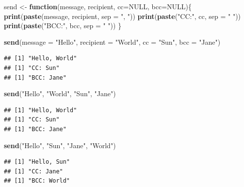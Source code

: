 \documentclass[
]{book}
\newenvironment{Shaded}{\begin{snugshade}}{\end{snugshade}}
\newcommand{\AttributeTok}[1]{\textcolor[rgb]{0.13,0.29,0.53}{#1}}
\newcommand{\ConstantTok}[1]{\textcolor[rgb]{0.56,0.35,0.01}{#1}}
\newcommand{\ControlFlowTok}[1]{\textcolor[rgb]{0.13,0.29,0.53}{\textbf{#1}}}
\newcommand{\FunctionTok}[1]{\textcolor[rgb]{0.13,0.29,0.53}{\textbf{#1}}}
\newcommand{\NormalTok}[1]{#1}
\newcommand{\OtherTok}[1]{\textcolor[rgb]{0.56,0.35,0.01}{#1}}
\newcommand{\StringTok}[1]{\textcolor[rgb]{0.31,0.60,0.02}{#1}}
\begin{document}
\begin{Shaded}
\begin{Highlighting}[]
\NormalTok{send }\OtherTok{\textless{}{-}} \ControlFlowTok{function}\NormalTok{(message, recipient, }\AttributeTok{cc=}\ConstantTok{NULL}\NormalTok{, }\AttributeTok{bcc=}\ConstantTok{NULL}\NormalTok{)\{}
  \FunctionTok{print}\NormalTok{(}\FunctionTok{paste}\NormalTok{(message, recipient, }\AttributeTok{sep =} \StringTok{", "}\NormalTok{))}
  \FunctionTok{print}\NormalTok{(}\FunctionTok{paste}\NormalTok{(}\StringTok{"CC:"}\NormalTok{, cc, }\AttributeTok{sep =} \StringTok{" "}\NormalTok{))}
  \FunctionTok{print}\NormalTok{(}\FunctionTok{paste}\NormalTok{(}\StringTok{"BCC:"}\NormalTok{, bcc, }\AttributeTok{sep =} \StringTok{" "}\NormalTok{))}
\NormalTok{\}}

\FunctionTok{send}\NormalTok{(}\AttributeTok{message =} \StringTok{"Hello"}\NormalTok{, }\AttributeTok{recipient =} \StringTok{"World"}\NormalTok{, }\AttributeTok{cc =} \StringTok{"Sun"}\NormalTok{, }\AttributeTok{bcc =} \StringTok{"Jane"}\NormalTok{)}
\end{Highlighting}
\end{Shaded}

\begin{verbatim}
## [1] "Hello, World"
## [1] "CC: Sun"
## [1] "BCC: Jane"
\end{verbatim}

\begin{Shaded}
\begin{Highlighting}[]
\FunctionTok{send}\NormalTok{(}\StringTok{"Hello"}\NormalTok{, }\StringTok{"World"}\NormalTok{, }\StringTok{"Sun"}\NormalTok{, }\StringTok{"Jane"}\NormalTok{)}
\end{Highlighting}
\end{Shaded}

\begin{verbatim}
## [1] "Hello, World"
## [1] "CC: Sun"
## [1] "BCC: Jane"
\end{verbatim}

\begin{Shaded}
\begin{Highlighting}[]
\FunctionTok{send}\NormalTok{(}\StringTok{"Hello"}\NormalTok{, }\StringTok{"Sun"}\NormalTok{, }\StringTok{"Jane"}\NormalTok{, }\StringTok{"World"}\NormalTok{)}
\end{Highlighting}
\end{Shaded}

\begin{verbatim}
## [1] "Hello, Sun"
## [1] "CC: Jane"
## [1] "BCC: World"
\end{verbatim}
\end{document}
